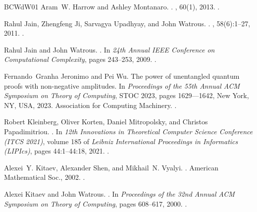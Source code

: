 \documentclass[10pt,a4paper]{article}
\theoremstyle{definition}
\begin{document}
\begin{thebibliography}{BCWdW01}
Aram~W. Harrow and Ashley Montanaro.
.
, 60(1), 2013.
\newblock \href {https://doi.org/10.1145/2432622.2432625}
  {}.

Rahul Jain, Zhengfeng Ji, Sarvagya Upadhyay, and John Watrous.
.
, 58(6):1--27, 2011.
\newblock \href {https://doi.org/10.1145/2049697.2049704}
  {}.

Rahul Jain and John Watrous.
.
\newblock In {\em 24th Annual IEEE Conference on Computational Complexity},
  pages 243--253, 2009.
\newblock \href {https://doi.org/10.1109/CCC.2009.26}
  {}.

Fernando~Granha Jeronimo and Pei Wu.
\newblock The power of unentangled quantum proofs with non-negative amplitudes.
\newblock In {\em Proceedings of the 55th Annual ACM Symposium on Theory of
  Computing}, STOC 2023, pages 1629–--1642, New York, NY, USA, 2023.
  Association for Computing Machinery.
\newblock \href {https://doi.org/10.1145/3564246.3585248}
  {}.

Robert Kleinberg, Oliver Korten, Daniel Mitropolsky, and Christos
  Papadimitriou.
.
\newblock In {\em 12th Innovations in Theoretical Computer Science Conference
  (ITCS 2021)}, volume 185 of {\em Leibniz International Proceedings in
  Informatics (LIPIcs)}, pages 44:1--44:18, 2021.
\newblock \href {https://doi.org/10.4230/LIPIcs.ITCS.2021.44}
  {}.

Alexei~Y. Kitaev, Alexander Shen, and Mikhail~N. Vyalyi.
.
\newblock American Mathematical Soc., 2002.
\newblock \href {https://doi.org/10.1090/gsm/047} {}.

Alexei Kitaev and John Watrous.
.
\newblock In {\em Proceedings of the 32nd Annual ACM Symposium on Theory of
  Computing}, pages 608--617, 2000.
\newblock \href {https://doi.org/10.1145/335305.335387}
  {}.


\end{thebibliography}
\end{document}
